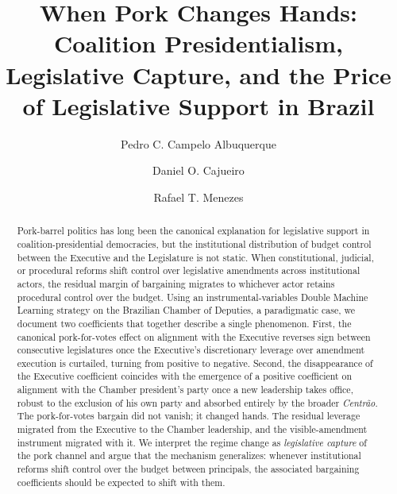 \documentclass[preprint,12pt,authoryear]{elsarticle}
\begin{document}
\begin{frontmatter}

\title{When Pork Changes Hands:\\
Coalition Presidentialism, Legislative Capture, and the Price of Legislative Support in Brazil}

\author[pedro]{Pedro C. Campelo Albuquerque}
\author[daniel]{Daniel O. Cajueiro}
\author[rafael]{Rafael T. Menezes}

\address[pedro]{Department of Economics, University of Brasilia, Campus Universit\'ario Darcy Ribeiro -- FACE, Bras\'ilia, DF 70910-900, Brazil. \textit{Email:} pedro.caiua@aluno.unb.br}

\address[daniel]{Department of Economics and National Institute of Science and Technology for Complex Systems (INCT-SC), University of Brasilia, Bras\'ilia, DF 70910-900, Brazil.}

\address[rafael]{Department of Economics, University of Brasilia, Bras\'ilia, DF 70910-900, Brazil.}

\begin{abstract}
Pork-barrel politics has long been the canonical explanation for legislative support in coalition-presidential democracies, but the institutional distribution of budget control between the Executive and the Legislature is not static. When constitutional, judicial, or procedural reforms shift control over legislative amendments across institutional actors, the residual margin of bargaining migrates to whichever actor retains procedural control over the budget. Using an instrumental-variables Double Machine Learning strategy on the Brazilian Chamber of Deputies, a paradigmatic case, we document two coefficients that together describe a single phenomenon. First, the canonical pork-for-votes effect on alignment with the Executive reverses sign between consecutive legislatures once the Executive's discretionary leverage over amendment execution is curtailed, turning from positive to negative. Second, the disappearance of the Executive coefficient coincides with the emergence of a positive coefficient on alignment with the Chamber president's party once a new leadership takes office, robust to the exclusion of his own party and absorbed entirely by the broader \emph{Centr\~ao}. The pork-for-votes bargain did not vanish; it changed hands. The residual leverage migrated from the Executive to the Chamber leadership, and the visible-amendment instrument migrated with it. We interpret the regime change as \emph{legislative capture} of the pork channel and argue that the mechanism generalizes: whenever institutional reforms shift control over the budget between principals, the associated bargaining coefficients should be expected to shift with them.
\end{abstract}


\end{frontmatter}
\end{document}
